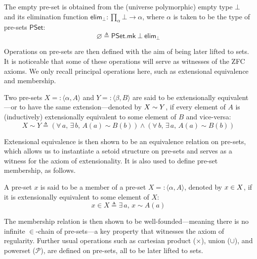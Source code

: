 \begin{definition}
  The empty pre-set is obtained from the (universe polymorphic) empty type \(\bot\) and its elimination function \(\displaystyle\mathsf{elim}_\bot : \prod_\alpha \bot \to \alpha\), where \(\alpha\) is taken to be the type of pre-sets \(\mathsf{PSet}\):
  \begin{equation*}
    \varnothing \triangleq \mathsf{PSet.mk}\ \bot\ \mathsf{elim}_\bot
  \end{equation*}
\end{definition}

Operations on pre-sets are then defined with the aim of being later lifted to sets.
It is noticeable that some of these operations will serve as witnesses of the ZFC axioms.
We only recall principal operations here, such as extensional equivalence and membership.

\begin{definition}
  Two pre-sets \(X =: \langle \alpha, A \rangle\) and \(Y =: \langle \beta, B \rangle\) are said to be extensionally equivalent---or to have the same extension---denoted by \(X \sim Y\), if every element of \(A\) is (inductively) extensionally equivalent to some element of \(B\) and vice-versa:
  \begin{equation*}
    X \sim Y \triangleq \left(\forall\, a,\, \exists\, b,\, A(a) \sim B(b)\right) \land \left(\forall\, b,\, \exists\, a,\, A(a) \sim B(b)\right)
  \end{equation*}
\end{definition}
Extensional equivalence is then shown to be an equivalence relation on pre-sets, which allows us to instantiate a setoid structure on pre-sets and serves as a witness for the axiom of extensionality.
It is also used to define pre-set membership, as follows.
\begin{definition}
  A pre-set \(x\) is said to be a member of a pre-set \(X =: \langle \alpha, A \rangle\), denoted by \(x \in X\), if it is extensionally equivalent to some element of \(X\):
  \begin{equation*}
    x \in X \triangleq \exists\, a,\, x \sim A(a)
  \end{equation*}
\end{definition}

The membership relation is then shown to be well-founded---meaning there is no infinite \(\in\)-chain of pre-sets---a key property that witnesses the axiom of regularity.
Further usual operations such as cartesian product (\(\times\)), union (\(\cup\)), and powerset (\(\mathcal{P}\)), are defined on pre-sets, all to be later lifted to sets.

